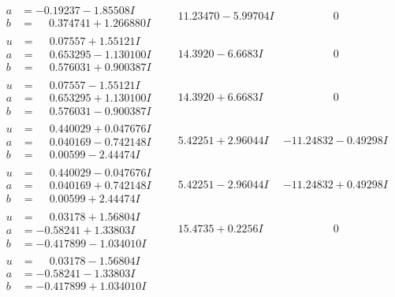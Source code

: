 \documentclass[1p]{elsarticle_modified}
\theoremstyle{definition}
\begin{document}
$$\begin{array}{c|c|c}
\begin{aligned}
a &= -0.19237 - 1.85508 I \\
b &= \phantom{-}0.374741 + 1.266880 I\end{aligned}
 & \phantom{-}11.23470 - 5.99704 I & \phantom{-0.000000 } 0 \\ \hline\begin{aligned}
u &= \phantom{-}0.07557 + 1.55121 I \\
a &= \phantom{-}0.653295 - 1.130100 I \\
b &= \phantom{-}0.576031 + 0.900387 I\end{aligned}
 & \phantom{-}14.3920 - 6.6683 I & \phantom{-0.000000 } 0 \\ \hline\begin{aligned}
u &= \phantom{-}0.07557 - 1.55121 I \\
a &= \phantom{-}0.653295 + 1.130100 I \\
b &= \phantom{-}0.576031 - 0.900387 I\end{aligned}
 & \phantom{-}14.3920 + 6.6683 I & \phantom{-0.000000 } 0 \\ \hline\begin{aligned}
u &= \phantom{-}0.440029 + 0.047676 I \\
a &= \phantom{-}0.040169 - 0.742148 I \\
b &= \phantom{-}0.00599 - 2.44474 I\end{aligned}
 & \phantom{-}5.42251 + 2.96044 I & -11.24832 - 0.49298 I \\ \hline\begin{aligned}
u &= \phantom{-}0.440029 - 0.047676 I \\
a &= \phantom{-}0.040169 + 0.742148 I \\
b &= \phantom{-}0.00599 + 2.44474 I\end{aligned}
 & \phantom{-}5.42251 - 2.96044 I & -11.24832 + 0.49298 I \\ \hline\begin{aligned}
u &= \phantom{-}0.03178 + 1.56804 I \\
a &= -0.58241 + 1.33803 I \\
b &= -0.417899 - 1.034010 I\end{aligned}
 & \phantom{-}15.4735 + 0.2256 I & \phantom{-0.000000 } 0 \\ \hline\begin{aligned}
u &= \phantom{-}0.03178 - 1.56804 I \\
a &= -0.58241 - 1.33803 I \\
b &= -0.417899 + 1.034010 I\end{aligned}

\end{array}$$
\end{document}
